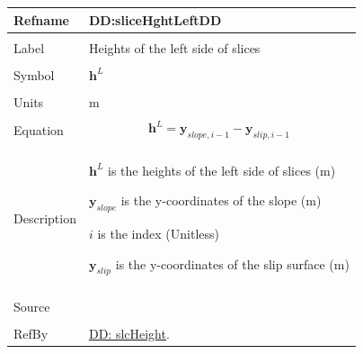 \documentclass[12pt]{article}
\begin{document}
\noindent \begin{minipage}{\textwidth}
\begin{tabular}{p{} p{}}
\toprule \textbf{Refname} & \textbf{DD:sliceHghtLeftDD}
\label{DD:sliceHghtLeftDD}
\\ \midrule \\
Label & Heights of the left side of slices
\\ \midrule \\
Symbol & ${\mathbf{h}^{L}}$
\\ \midrule \\
Units & m
\\ \midrule \\
Equation & \begin{displaymath}
           {\mathbf{h}^{L}}={\mathbf{y}_{slope,i-1}}-{\mathbf{y}_{slip,i-1}}
           \end{displaymath}
\\ \midrule \\
Description & \begin{symbDescription}
              \item{${\mathbf{h}^{L}}$ is the heights of the left side of slices (m)}
              \item{${\mathbf{y}_{slope}}$ is the y-coordinates of the slope (m)}
              \item{$i$ is the index (Unitless)}
              \item{${\mathbf{y}_{slip}}$ is the y-coordinates of the slip surface (m)}
              \end{symbDescription}
\\ \midrule \\
Source & \cite{fredlund1977}
\\ \midrule \\
RefBy & \hyperref[DD:slcHeight]{DD: slcHeight}.
\\ \bottomrule \end{tabular}
\end{minipage}
\end{document}
